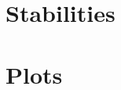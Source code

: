 \begin{appendix}
	\chapter{Stabilities}\label{app:stabilities}
		
	\chapter{Plots}
		
		
\end{appendix}